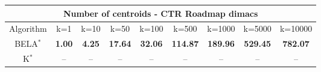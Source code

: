 \begin{tabular}{c|cccccccc}\toprule
\multicolumn{9}{c}{Number of centroids - CTR Roadmap dimacs}\\ \midrule
Algorithm & k=1 & k=10 & k=50 & k=100 & k=500 & k=1000 & k=5000 & k=10000 \\ \midrule
BELA$^*$ & \textbf{1.00} & \textbf{4.25} & \textbf{17.64} & \textbf{32.06} & \textbf{114.87} & \textbf{189.96} & \textbf{529.45} & \textbf{782.07} \\
K$^*$ & -- & -- & -- & -- & -- & -- & -- & -- \\ \bottomrule 
\end{tabular}

